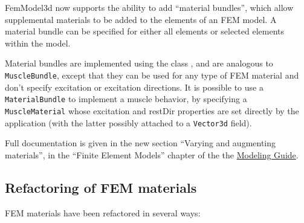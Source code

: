 \documentclass{article}
\begin{document}
FemModel3d now supports the ability to add ``material bundles'', which
allow supplemental materials to be added to the elements of an FEM
model.  A material bundle can be specified for either all elements or
selected elements within the model. 

Material bundles are implemented using the class
, and are
analogous to {\tt MuscleBundle}, except that they can be used for any
type of FEM material and don't specify excitation or excitation
directions.  It is possible to use a {\tt MaterialBundle} to implement a
muscle behavior, by specifying a {\tt MuscleMaterial} whose {\sf
excitation} and {\sf restDir} properties are set directly by the
application (with the latter possibly attached to a {\tt Vector3d} field).

Full documentation is given in the new section ``Varying and
augmenting materials'', in the ``Finite Element Models'' chapter of
the the
\href{http://www.artisynth.org/doc/info/modelguide/modelguide.html}
{Modeling Guide}.

\subsection*{Refactoring of FEM materials}

FEM materials have been refactored in several ways:
\end{document}
